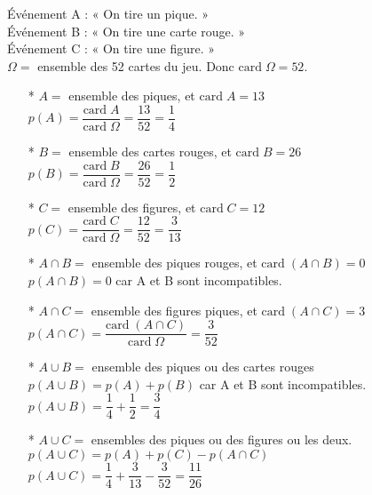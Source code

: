 Événement A : « On tire un pique. » \\
Événement B : « On tire une carte rouge. » \\
Événement C : « On tire une figure. » \\

$\Omega =$ ensemble des 52 cartes du jeu. Donc $\mathrm{card} \; \Omega = 52$. 

\begin{itemize}
\item[*] $A = $ ensemble des piques, et $\mathrm{card} \; A = 13$ \\ $p\left(A\right) = \dfrac{\mathrm{card} \; A}{\mathrm{card} \; \Omega} = \dfrac{13}{52} = \dfrac{1}{4} $ \\
\item[*] $B = $ ensemble des cartes rouges, et $\mathrm{card} \; B = 26$ \\ $p\left(B\right) = \dfrac{\mathrm{card} \; B}{\mathrm{card} \; \Omega} = \dfrac{26}{52} = \dfrac{1}{2} $ \\
\item[*] $C = $ ensemble des figures, et $\mathrm{card} \; C = 12$ \\ $p\left(C\right) = \dfrac{\mathrm{card} \; C}{\mathrm{card} \; \Omega} = \dfrac{12}{52} = \dfrac{3}{13} $ \\
\item[*] $A\cap B = $ ensemble des piques rouges, et $\mathrm{card} \; \left(A \cap B\right) = 0$ \\ $p\left(A \cap B\right) = 0$ car A et B sont incompatibles. \\
\item[*] $A \cap C = $ ensemble des figures piques, et $\mathrm{card} \; \left(A \cap C\right) = 3$ \\ $p\left(A \cap C \right) = \dfrac{ \mathrm{card} \; \left(A \cap C\right)}{\mathrm{card} \; \Omega} = \dfrac{3}{52} $ \\
\item[*] $A \cup B = $ ensemble des piques ou des cartes rouges \\ $p\left(A \cup B\right) = p\left(A\right) + p\left(B\right)$ car A et B sont incompatibles. \\ $p\left(A \cup B\right) = \dfrac{1}{4} + \dfrac{1}{2} = \dfrac{3}{4} $ \\
\item[*]  $ A \cup C =$ ensembles des piques ou des figures ou les deux. \\ $p\left(A \cup C\right) = p\left(A\right) + p\left(C\right) - p\left(A \cap C\right) $ \\ $p\left(A \cup C\right) = \dfrac{1}{4} + \dfrac{3}{13} - \dfrac{3}{52} = \dfrac{11}{26} $ \\
\end{itemize}

